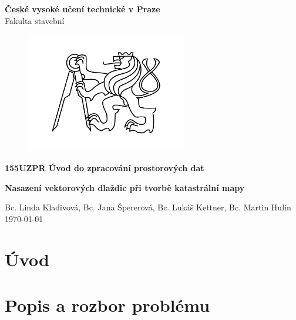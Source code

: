 \documentclass[12pt]{article}
\begin{document}
\begin{titlepage}
\centering
\Large \textbf{České vysoké učení technické v Praze }\\ Fakulta stavební
\vspace{2cm}

\begin{figure}[h!] %
\centering
\includegraphics[width=7cm]{./img/cvut.png}
\end{figure}
 
\Large \textbf{155UZPR Úvod do zpracování prostorových dat}
\vspace{1cm}

\LARGE  \textbf{ Nasazení vektorových dlaždic při tvorbě katastrální mapy}
\vspace{3cm}

\Large Bc. Linda Kladivová, Bc. Jana Špererová, Bc. Lukáš Kettner, Bc. Martin Hulín \\ \today

 \thispagestyle{empty} %
\end{titlepage}

\tableofcontents    %
\newpage %
\section{Úvod}



\clearpage 
\section{Popis a rozbor problému}
\end{document}
